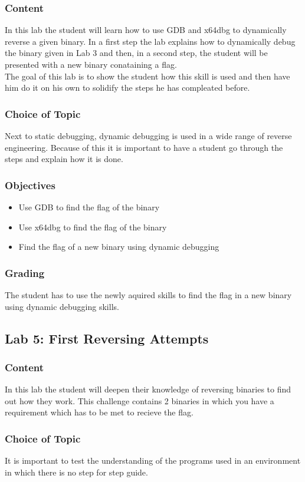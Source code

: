 \subsubsection*{Content}
In this lab the student will learn how to use GDB and x64dbg to dynamically reverse a given binary. In a first step the lab explains how to dynamically debug the binary given in Lab 3 and then, in a second step, the student will be presented with a new binary conataining a flag. \\
The goal of this lab is to show the student how this skill is used and then have him do it on his own to solidify the steps he has compleated before.
\subsubsection*{Choice of Topic}
Next to static debugging, dynamic debugging is used in a wide range of reverse engineering. Because of this it is important to have a student go through the steps and explain how it is done. 
\subsubsection*{Objectives}
\begin{itemize}
    \item Use GDB to find the flag of the binary
    \item Use x64dbg to find the flag of the binary
    \item Find the flag of a new binary using dynamic debugging
\end{itemize}
\subsubsection*{Grading}
The student has to use the newly aquired skills to find the flag in a new binary using dynamic debugging skills.


\subsection{Lab 5: First Reversing Attempts}
\subsubsection*{Content}
In this lab the student will deepen their knowledge of reversing binaries to find out how they work. This challenge contains 2 binaries in which you have a requirement which has to be met to recieve the flag.
\subsubsection*{Choice of Topic}
It is important to test the understanding of the programs used in an environment in which there is no step for step guide.
